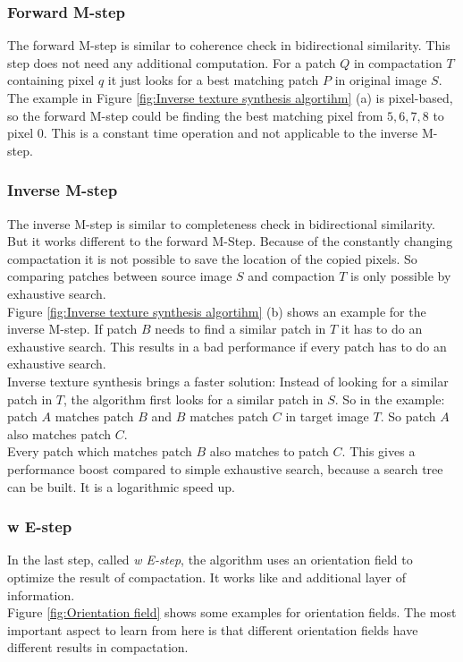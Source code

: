 \subsubsection{Forward M-step}
The forward M-step is similar to coherence check in bidirectional similarity. This step does not need any additional computation. For a patch $Q$ in compactation $T$ containing pixel $q$ it just looks for a best matching patch $P$ in original image $S$.\\
The example in Figure \ref{fig:Inverse texture synthesis algortihm} (a) is pixel-based, so the forward M-step could be finding the best matching pixel from ${5,6,7,8}$ to pixel $0$. This is a constant time operation and not applicable to the inverse M-step. 

\subsubsection{Inverse M-step}
The inverse M-step is similar to completeness check in bidirectional similarity. But it works different to the forward M-Step. Because of the constantly changing compactation it is not possible to save the location of the copied pixels. So comparing patches between source image $S$ and compaction $T$ is only possible by exhaustive search.\\
Figure \ref{fig:Inverse texture synthesis algortihm} (b) shows an example for the inverse M-step. If patch $B$ needs to find a similar patch in $T$ it has to do an exhaustive search. This results in a bad performance if every patch has to do an exhaustive search.\\
Inverse texture synthesis brings a faster solution: Instead of looking for a similar patch in $T$, the algorithm first looks for a similar patch in $S$. So in the example: patch $A$ matches patch $B$ and $B$ matches patch $C$ in target image $T$. So patch $A$ also matches patch $C$.\\
Every patch which matches patch $B$ also matches to patch $C$. This gives a performance boost compared to simple exhaustive search, because a search tree can be built. It is a logarithmic speed up.


\subsubsection{w E-step}
In the last step, called \textit{w E-step}, the algorithm uses an orientation field to optimize the result of compactation. It works like and additional layer of information.\\
Figure \ref{fig:Orientation field} shows some examples for orientation fields. The most important aspect to learn from here is that different orientation fields have different results in compactation.

